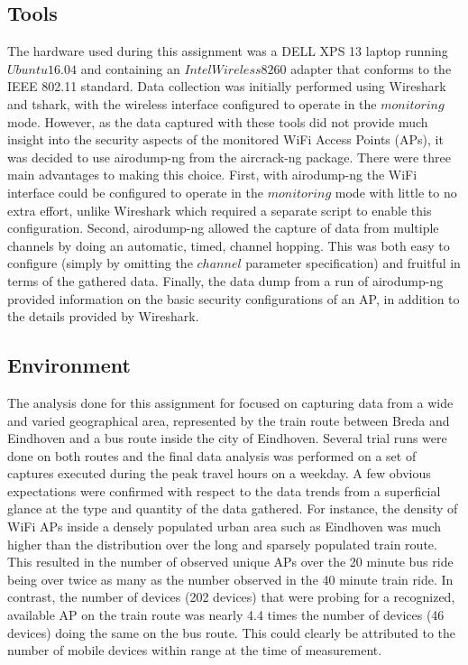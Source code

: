\documentclass[letterpaper, 10 pt, conference]{ieeeconf}  %
\begin{document}
\subsection{Tools}
The hardware used during this assignment was a DELL XPS 13 laptop running $Ubuntu 16.04$ and containing an $Intel Wireless 8260$ adapter that conforms to the IEEE 802.11 standard. Data collection was initially performed using Wireshark and tshark, with the wireless interface configured to operate in the $monitoring$ mode. However, as the data captured with these tools did not provide much insight into the security aspects of the monitored WiFi Access Points (APs), it was decided to use airodump-ng from the aircrack-ng package. There were three main advantages to making this choice. First, with airodump-ng the WiFi interface could be configured to operate in the $monitoring$ mode with little to no extra effort, unlike Wireshark which required a separate script to enable this configuration. Second, airodump-ng allowed the capture of data from multiple channels by doing an automatic, timed, channel hopping. This was both easy to configure (simply by omitting the $channel$ parameter specification) and fruitful in terms of the gathered data. Finally, the data dump from a run of airodump-ng provided information on the basic security configurations of an AP, in addition to the details provided by Wireshark. 

\subsection{Environment}
The analysis done for this assignment for focused on capturing data from a wide and varied geographical area, represented by the train route between Breda and Eindhoven and a bus route inside the city of Eindhoven. Several trial runs were done on both routes and the final data analysis was performed on a set of captures executed during the peak travel hours on a weekday. A few obvious expectations were confirmed with respect to the data trends from a superficial glance at the type and quantity of the data gathered. For instance, the density of WiFi APs inside a densely populated urban area such as Eindhoven was much higher than the distribution over the long and sparsely populated train route. This resulted in the number of observed unique APs over the 20 minute bus ride being over twice as many as the number observed in the 40 minute train ride. In contrast, the number of devices (202 devices) that were probing for a recognized, available AP on the train route was nearly 4.4 times the number of devices (46 devices) doing the same on the bus route. This could clearly be attributed to the number of mobile devices within range at the time of measurement. 
\end{document}
